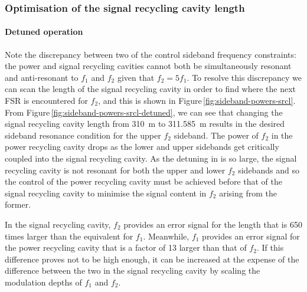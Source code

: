 \subsubsection{Optimisation of the signal recycling cavity length}

\paragraph{Detuned operation}
Note the discrepancy between two of the control sideband frequency constraints: the power and signal recycling cavities cannot both be simultaneously resonant and anti-resonant to $f_1$ and $f_2$ given that $f_2 = 5 f_1$. To resolve this discrepancy we can scan the length of the signal recycling cavity in order to find where the next \gls{FSR} is encountered for $f_2$, and this is shown in Figure\,\ref{fig:sideband-powers-srcl}. From Figure\,\ref{fig:sideband-powers-srcl-detuned}, we can see that changing the signal recycling cavity length from \SI{310}{\meter} to \SI{311.585}{\meter} results in the desired sideband resonance condition for the upper $f_2$ sideband. The power of $f_2$ in the power recycling cavity drops as the lower and upper sidebands get critically coupled into the signal recycling cavity. As the detuning in \ETLF{} is so large, the signal recycling cavity is not resonant for both the upper and lower $f_2$ sidebands and so the control of the power recycling cavity must be achieved before that of the signal recycling cavity to minimise the signal content in $f_2$ arising from the former.

In the signal recycling cavity, $f_2$ provides an error signal for the length that is \num{650} times larger than the equivalent for $f_1$. Meanwhile, $f_1$ provides an error signal for the power recycling cavity that is a factor of \num{13} larger than that of $f_2$. If this difference proves not to be high enough, it can be increased at the expense of the difference between the two in the signal recycling cavity by scaling the modulation depths of $f_1$ and $f_2$.

